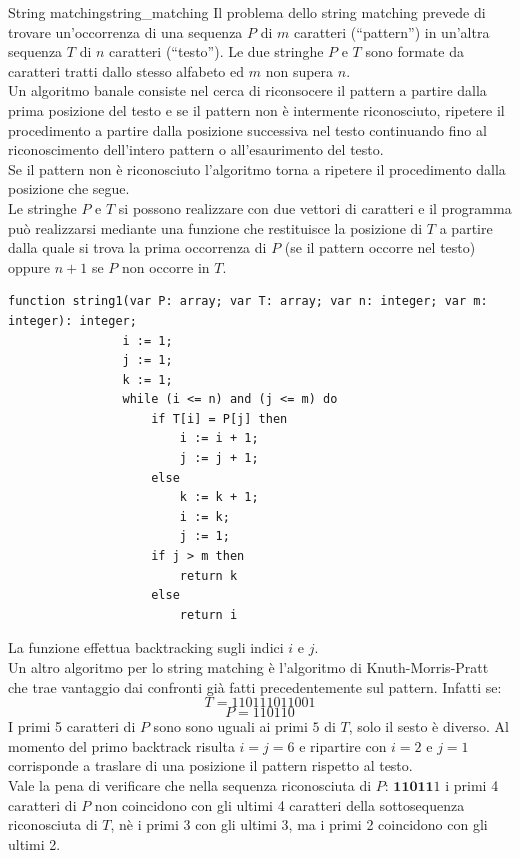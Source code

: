 \documentclass[12pt]{report}
\newcommand{\nmu}{}
\begin{document}
 	\begin{example}{\nmu String matching}{string_matching}
 		Il problema dello string matching prevede di trovare un'occorrenza di una sequenza $P$ di  $m$ caratteri (``pattern'')
 		in un'altra sequenza $T$ di $n$ caratteri (``testo''). Le due stringhe $P$ e $T$ sono formate da caratteri tratti dallo stesso alfabeto ed $m$ non supera $n$. \\
 		Un algoritmo banale consiste nel cerca di riconsocere il pattern a partire dalla prima posizione del testo e se il pattern non è intermente riconosciuto, ripetere il procedimento a partire dalla posizione successiva nel testo continuando fino al riconoscimento dell'intero pattern o all'esaurimento del testo. \\
 		Se il pattern non è riconosciuto l'algoritmo torna a ripetere il procedimento dalla posizione che segue. \\
 		Le stringhe $P$ e $T$ si possono realizzare con due vettori di caratteri e il programma può realizzarsi mediante una funzione che restituisce la posizione di $T$ a partire dalla quale si trova la prima occorrenza di $P$ (se il pattern occorre nel testo) oppure $n + 1$ se $P$ non occorre in $T$.
 		\begin{lstlisting}[style=pascalstyle]
 			function string1(var P: array; var T: array; var n: integer; var m: integer): integer;
 				i := 1;
 				j := 1;
 				k := 1;
 				while (i <= n) and (j <= m) do
 					if T[i] = P[j] then
 						i := i + 1;
 						j := j + 1;
 					else
 						k := k + 1;
 						i := k;
 						j := 1;
 					if j > m then
 						return k
 					else
 						return i
 		\end{lstlisting}
 		La funzione effettua backtracking sugli indici $i$ e $j$.  	\\
 		Un altro algoritmo per lo string matching è l'algoritmo di Knuth-Morris-Pratt che trae vantaggio dai confronti già fatti precedentemente sul pattern. Infatti se:
 		\[
 		T = 110111011001
 		\]
 		\[
 		P = 110110
 		\]
 		I primi 5 caratteri di $P$ sono sono uguali ai primi $5$ di $T$, solo il sesto è diverso. Al momento del primo backtrack risulta $i = j = 6$ e ripartire con  $i = 2$ e $j = 1$ corrisponde a traslare di una posizione il pattern rispetto al testo. \\
 		Vale la pena di verificare che nella sequenza riconosciuta di $P$: $\mathbf{11011}1$ i primi 4 caratteri di $P$ non coincidono con gli ultimi 4 caratteri della sottosequenza riconosciuta di $T$, nè i primi 3 con gli ultimi 3, ma i primi 2 coincidono con gli ultimi 2. \\

\end{example}
\end{document}
